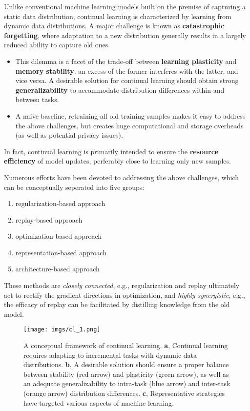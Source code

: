 \documentclass[9pt,dvipsnames]{beamer}
\begin{document}
\begin{frame}
    Unlike conventional machine learning models built on the premise of capturing a static data distribution, continual learning is characterized by learning from dynamic data distributions. A major challenge is known as \textbf{catastrophic forgetting}, where adaptation to a new distribution generally results in a largely reduced ability to capture old ones.
    \begin{itemize}
        \item This dilemma is a facet of the trade-off between \textbf{learning plasticity} and \textbf{memory stability}: an excess of the former interferes with the latter, and vice versa. A desirable solution for continual learning should obtain strong \textbf{generalizability} to accommodate distribution differences within and between tasks.
        \item A naive baseline, retraining all old training samples makes it easy to address the above challenges, but creates huge computational and storage overheads (as well as potential privacy issues).
    \end{itemize}
    In fact, continual learning is primarily intended to ensure the \textbf{resource efficiency} of model updates, perferably close to learning only new samples.
\end{frame}

\begin{frame}
    Numerous efforts have been devoted to addressing the above challenges, which can be conceptually seperated into five groups:
    \begin{enumerate}
        \item regularization-based approach
        \item replay-based approach
        \item optimization-based approach
        \item representation-based approach
        \item architecture-based approach
    \end{enumerate}
    These methods are \textit{closely connected}, e.g., regularization and replay ultimately act to rectify the gradient directions in optimization, and \textit{highly synergistic}, e.g., the efficacy of replay can be facilitated by distilling knowledge from the old model.
\end{frame}
\begin{frame}
    \begin{figure}[ht]
        \centering
        \texttt{[image: imgs/cl\_1.png]}
        \caption{A conceptual framework of continual learning. \textbf{a}, Continual learning requires adapting to incremental tasks with dynamic data distributions. \textbf{b}, A desirable solution should ensure a proper balance between stability (red arrow) and plasticity (green arrow), as well as an adequate generalizability to intra-task (blue arrow) and inter-task (orange arrow) distribution differences. \textbf{c}, Representative strategies have targeted various aspects of machine learning.}
    \end{figure}
\end{frame}
\end{document}
